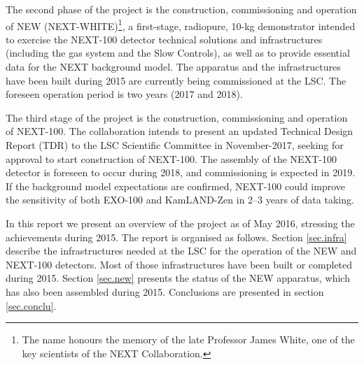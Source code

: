 The second phase of the project is the construction, commissioning and operation of NEW (NEXT-WHITE)\footnote{The name honours the memory of the late Professor James White, one of the key scientists of the NEXT Collaboration.}, a first-stage, radiopure, 10-kg demonstrator intended to exercise the NEXT-100 detector technical solutions and infrastructures (including the gas system and the Slow Controls), as well as to provide essential data for the NEXT background model. The apparatus and the infrastructures have been built during 2015 are currently being commissioned at the LSC. The foreseen operation period is two years (2017 and 2018). 

The third stage of the project is the construction, commissioning and operation of NEXT-100. The collaboration intends to present an updated Technical Design Report (TDR) to the LSC Scientific Committee in November-2017, seeking for approval to start construction of NEXT-100. The assembly of the NEXT-100 detector is foreseen to occur during 2018, and commissioning is expected in 2019. If the background model expectations are confirmed, NEXT-100 could improve the sensitivity of both EXO-100 and KamLAND-Zen in 2--3 years of data taking\cite{Martin-Albo:2015rhw}. 

In this report we present an overview of the  project as of May 2016, stressing the achievements during 2015. The report is organised as follows. Section \ref{sec.infra} describe the infrastructures needed at the LSC for the operation of the NEW and NEXT-100 detectors.  Most of those infrastructures have been built or completed during 2015. Section \ref{sec.new} presents the status of the NEW apparatus, which has also been assembled during 2015. Conclusions are presented in section \ref{sec.conclu}.




